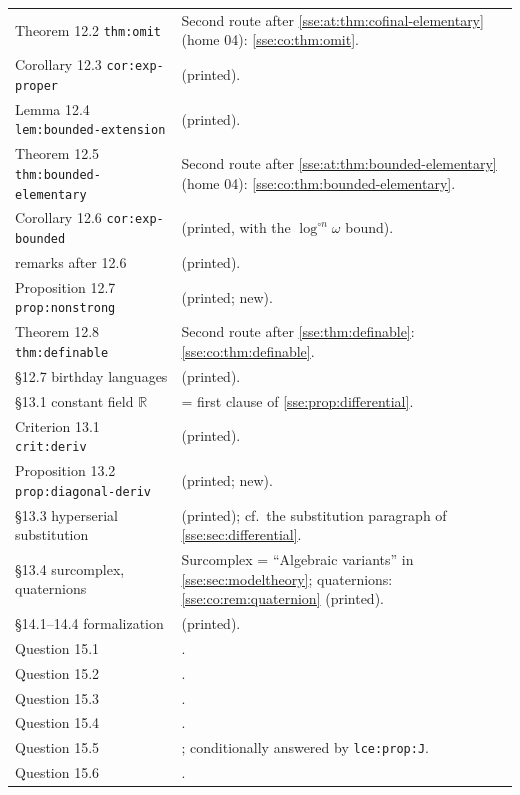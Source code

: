 \documentclass[11pt,a4paper]{article}
\numberwithin{equation}{section}
\theoremstyle{plain}
\theoremstyle{definition}
\theoremstyle{remark}
\newcommand{\R}{\mathbb{R}}
\newcommand{\lbl}[1]{\nolinkurl{#1}}%
\newcommand{\fn}[1]{\nolinkurl{#1}}%
\begin{document}
\begin{longtable}{P{34mm}P{116mm}}
Theorem 12.2 \fn{thm:omit} & Second route after \cref{sse:at:thm:cofinal-elementary} (home 04): \cref{sse:co:thm:omit}. \\
Corollary 12.3 \fn{cor:exp-proper} &  (printed). \\
Lemma 12.4 \fn{lem:bounded-extension} &  (printed). \\
Theorem 12.5 \fn{thm:bounded-elementary} & Second route after \cref{sse:at:thm:bounded-elementary} (home 04): \cref{sse:co:thm:bounded-elementary}. \\
Corollary 12.6 \fn{cor:exp-bounded} &  (printed, with the $\log^{\circ n}\omega$ bound). \\
remarks after 12.6 &  (printed). \\
Proposition 12.7 \fn{prop:nonstrong} &  (printed; new). \\
Theorem 12.8 \fn{thm:definable} & Second route after \cref{sse:thm:definable}: \cref{sse:co:thm:definable}. \\
\S12.7 birthday languages &  (printed). \\
\S13.1 constant field $\R$ & = first clause of \cref{sse:prop:differential}. \\
Criterion 13.1 \fn{crit:deriv} &  (printed). \\
Proposition 13.2 \fn{prop:diagonal-deriv} &  (printed; new). \\
\S13.3 hyperserial substitution &  (printed); cf.\ the substitution paragraph of \cref{sse:sec:differential}. \\
\S13.4 surcomplex, quaternions & Surcomplex = ``Algebraic variants'' in \cref{sse:sec:modeltheory}; quaternions: \cref{sse:co:rem:quaternion} (printed). \\
\S14.1--14.4 formalization &  (printed). \\
Question 15.1 & . \\
Question 15.2 & . \\
Question 15.3 & . \\
Question 15.4 & . \\
Question 15.5 & ; conditionally answered by \lbl{lce:prop:J}. \\
Question 15.6 & . \\

\end{longtable}
\end{document}
